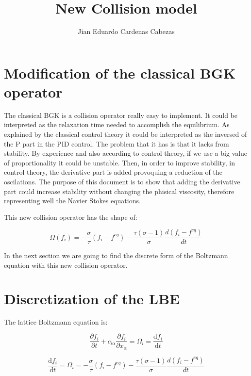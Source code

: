 \documentclass{article}
\title{\textbf{New Collision model}}
\author{Jian Eduardo Cardenas Cabezas}
\begin{document}
\maketitle

\section{Modification of the classical BGK operator}
The classical BGK is a collision operator really easy to implement. It could be interpreted as the relaxation time needed to accomplish the equilibrium.
As explained by the classical control theory it could be interpreted as the inversed of the P part in the PID control. The problem that it has is that it lacks from stability.
By experience and also according to control theory, if we use a big value of proportionality it could be unstable. Then, in order to improve stability, in control theory,
the derivative part is added provoquing a reduction of the oscilations. 
The purpose of this document is to show that adding the derivative part could increase stability without changing the phisical viscosity, therefore representing well the
Navier Stokes equations.

This new collision operator has the shape of:

\begin{equation}
    \Omega(f_i) = -\frac{\sigma}{\tau}(f_i-f^{eq}) - \frac{\tau(\sigma-1)}{\sigma}\frac{d(f_i-f^{eq})}{dt}    
\end{equation}

In the next section we are going to find the discrete form of the Boltzmann equation with this new collision operator.

\section{Discretization of the LBE}

The lattice Boltzmann equation is: 

\begin{equation}
    \frac{\partial f_{i}}{\partial t} +c_{i\alpha }\frac{\partial f_{i}}{\partial x_{\alpha }} =\Omega _{i} =\frac{\mathrm{d} f_{i}}{\mathrm{d} t}
\end{equation}

\begin{equation}
    \frac{\mathrm{d} f_{i}}{\mathrm{d} t}=\Omega _{i}= -\frac{\sigma}{\tau}(f_i-f^{eq}) - \frac{\tau(\sigma-1)}{\sigma}\frac{d(f_i-f^{eq})}{dt} 
\end{equation}
\end{document}
